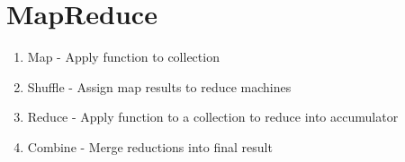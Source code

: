\documentclass[12pt]{article}
\begin{document}
\section{MapReduce}
\begin{enumerate}
  \item {Map - Apply function to collection}
  \item {Shuffle - Assign map results to reduce machines}
  \item {Reduce - Apply function to a collection to reduce into accumulator}
  \item {Combine - Merge reductions into final result}
\end{enumerate}
\end{document}
